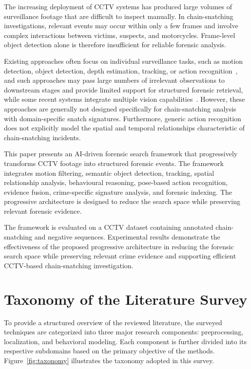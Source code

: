 \documentclass[runningheads]{llncs}
\begin{document}
The increasing deployment of CCTV systems has produced large volumes of
surveillance footage that are difficult to inspect manually. In
chain-snatching investigations, relevant events may occur within only a
few frames and involve complex interactions between victims, suspects,
and motorcycles. Frame-level object detection alone is therefore
insufficient for reliable forensic analysis.

Existing approaches often focus on individual surveillance tasks, such as
motion detection, object detection, depth estimation, tracking, or action
recognition~\cite{roy2018snatch}, and such approaches may pass large numbers of
irrelevant observations to downstream stages and provide limited
support for structured forensic retrieval, while some recent systems integrate
multiple vision capabilities~\cite{park2026foresea}. However, these
approaches are generally not designed specifically for chain-snatching
analysis with domain-specific snatch signatures. Furthermore, generic action
recognition does not explicitly model the spatial and temporal
relationships characteristic of chain-snatching incidents.

This paper presents an AI-driven forensic search framework that
progressively transforms CCTV footage into structured forensic events.
The framework integrates motion filtering, semantic object detection,
tracking, spatial relationship analysis, behavioural reasoning,
pose-based action recognition, evidence fusion, crime-specific
signature analysis, and forensic indexing. The progressive architecture
is designed to reduce the search space while preserving relevant
forensic evidence.

The framework is evaluated on a CCTV dataset containing annotated
chain-snatching and negative sequences. Experimental results demonstrate
the effectiveness of the proposed progressive architecture in reducing
the forensic search space while preserving relevant crime evidence and
supporting efficient CCTV-based chain-snatching investigation.

\section{Taxonomy of the Literature Survey}

To provide a structured overview of the reviewed literature, the surveyed techniques are categorized into three major research components: preprocessing, localization, and behavioral modeling. Each component is further divided into its respective subdomains based on the primary objective of the methods. Figure~\ref{fig:taxonomy} illustrates the taxonomy adopted in this survey.
\end{document}
